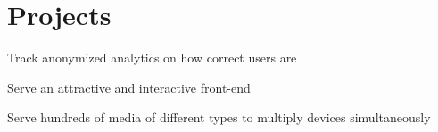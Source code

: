 \documentclass[]{deedy-resume-openfont}
\begin{document}
\begin{minipage}[t]{0.95\textwidth}




\section{Projects}



\begin{tightemize}
\item Track anonymized analytics on how correct users are
\item Serve an attractive and interactive front-end
\item Serve hundreds of media of different types to multiply devices simultaneously
\end{tightemize}


\end{minipage}
\end{document}
